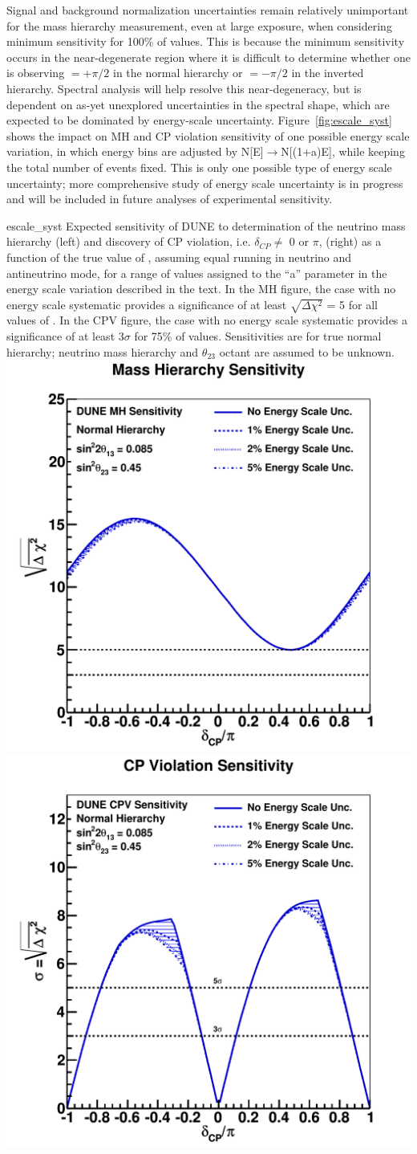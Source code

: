 Signal and
background normalization uncertainties remain
relatively unimportant for the mass hierarchy measurement, even at large exposure, when considering
minimum sensitivity for 100\% of \deltacp values. This is because the minimum sensitivity 
occurs in the near-degenerate region where it is difficult to determine
whether one is observing \deltacp $= + \pi/2 $ in the normal hierarchy
or \deltacp $=-\pi/2$ in the inverted hierarchy. Spectral analysis will
help resolve this near-degeneracy, but is dependent on as-yet
unexplored uncertainties in the spectral shape, which are expected to be dominated
by energy-scale uncertainty. Figure~\ref{fig:escale_syst} shows the
impact on MH and CP violation sensitivity of one possible energy scale variation, in which
energy bins are adjusted by N[E]$\rightarrow$N[(1+a)E], while keeping the total number of
events fixed. This is only one possible type of energy scale uncertainty; more comprehensive
study of energy scale uncertainty is in progress and will be included in
future analyses of experimental sensitivity.
%
\begin{cdrfigure}{escale_syst}{
Expected sensitivity of DUNE to determination of the neutrino mass
  hierarchy (left) and discovery of CP violation, i.e. $\delta_{CP} \ne$ 0 or $\pi$,
  (right) as a function of the true value of \deltacp, assuming 
  equal running in neutrino and antineutrino mode, for a range of values assigned to the
  ``a'' parameter in the energy scale variation described in the text. In the MH figure, the case with no
  energy scale systematic provides a significance of at least $\sqrt{\Delta\chi^2}$ = 5 for
  all values of \deltacp. In the CPV figure, the case with no energy scale systematic provides
  a significance of at least 3$\sigma$ for 75\% of \deltacp values.
  Sensitivities are for true normal hierarchy; neutrino mass hierarchy
  and $\theta_{23}$ octant are assumed to be unknown.}
\includegraphics[width=0.44\linewidth]{volume-physics/figures/mh_230ktmwyear_varyesyst.pdf}
\includegraphics[width=0.44\linewidth]{volume-physics/figures/cpv_890ktmwyear_varyesyst.pdf}
\end{cdrfigure}
%

